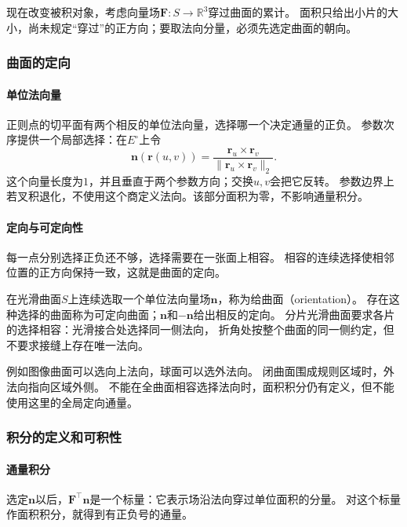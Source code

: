 现在改变被积对象，考虑向量场$\bm F:S\to\mathbb R^3$穿过曲面的累计。
面积只给出小片的大小，尚未规定“穿过”的正方向；要取法向分量，必须先选定曲面的朝向。

\subsubsection{曲面的定向}

\paragraph{单位法向量}

正则点的切平面有两个相反的单位法向量，选择哪一个决定通量的正负。
参数次序提供一个局部选择：在$E^\circ$上令
\[
 \bm n(\bm r(u,v))
 =\frac{\bm r_u\times\bm r_v}{\lVert\bm r_u\times\bm r_v\rVert_2}.
\]
这个向量长度为$1$，并且垂直于两个参数方向；交换$u,v$会把它反转。
参数边界上若叉积退化，不使用这个商定义法向。该部分面积为零，不影响通量积分。

\paragraph{定向与可定向性}

每一点分别选择正负还不够，选择需要在一张面上相容。
相容的连续选择使相邻位置的正方向保持一致，这就是曲面的定向。

\begin{definition}[曲面的定向]
\label{def:analysis-surface-orientation}
在光滑曲面$S$上连续选取一个单位法向量场$\bm n$，称为给曲面（orientation）。
存在这种选择的曲面称为可定向曲面；$\bm n$和$-\bm n$给出相反的定向。
分片光滑曲面要求各片的选择相容：光滑接合处选择同一侧法向，
折角处按整个曲面的同一侧约定，但不要求接缝上存在唯一法向。
\end{definition}

例如图像曲面可以选向上法向，球面可以选外法向。
闭曲面围成规则区域时，外法向指向区域外侧。
不能在全曲面相容选择法向时，面积积分仍有定义，但不能使用这里的全局定向通量。

\subsubsection{积分的定义和可积性}

\paragraph{通量积分}

选定$\bm n$以后，$\bm F^\top\bm n$是一个标量：它表示场沿法向穿过单位面积的分量。
对这个标量作面积积分，就得到有正负号的通量。

